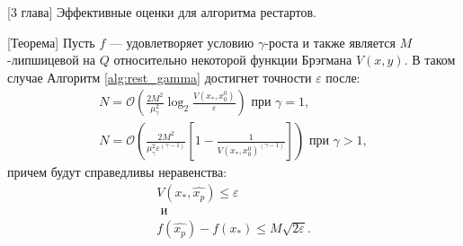 \begin{frame} {[3 глава] Эффективные оценки для алгоритма рестартов.}
\begin{block}{[Теорема]} \label{simple_restart}
    Пусть $f$ --- удовлетворяет условию $\gamma$-роста и также является $M$-липшицевой на $Q$ относительно некоторой функции Брэгмана $V(x, y)$. В таком случае Алгоритм \ref{alg:rest_gamma} достигнет точности $\varepsilon$ после:
    \begin{equation}
    \begin{aligned}
       N = \mathcal{O} \left(\frac{2 M^2}{\mu_{\gamma}^2} \log_2{\frac{V(x_*, x_0^0)}{\varepsilon}} \right) \text{ при } \gamma = 1, \\
       N = \mathcal{O} \left( \frac{2 M^2}{\mu_{\gamma}^2 \varepsilon^{(\gamma-1)} } \left[1 - \frac{1} {V(x_*, x_0^0)^{(\gamma - 1)}}\right] \right) \text{ при } \gamma > 1,
    \end{aligned}
    \end{equation}
    причем будут справедливы неравенства:
    \begin{equation}
    \begin{aligned}
       V(x_*, \widehat{x_p}) \leq \varepsilon\\
       \text{ и }\\
       f(\widehat{x_p}) - f(x_*) \leq M \sqrt{2 \varepsilon}.
    \end{aligned}
    \end{equation}
\end{block}
\end{frame}

